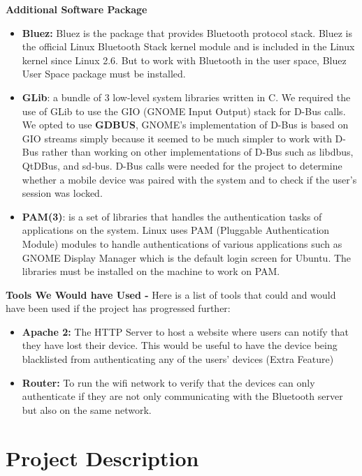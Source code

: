 \documentclass[letterpaper,twocolumn,10pt]{article}
\begin{document}
\hrulefill

\textbf{Additional Software Package}
\begin{itemize}[noitemsep]
\item \textbf{Bluez:} Bluez is the package that provides Bluetooth protocol stack. Bluez is the official Linux Bluetooth Stack kernel module and is included in the Linux kernel since Linux 2.6. But to work with Bluetooth in the user space, Bluez User Space package must be installed.
\item \textbf{GLib}: a bundle of 3 low-level system libraries written in C. We required the use of GLib to use the GIO (GNOME Input Output) stack for D-Bus calls. We opted to use \textbf{GDBUS}, GNOME's implementation of D-Bus is based on GIO streams simply because it seemed to be much simpler to work with D-Bus rather than working on other implementations of D-Bus such as libdbus, QtDBus, and sd-bus. D-Bus calls were needed for the project to determine whether a mobile device was paired with the system and to check if the user's session was locked.

\item \textbf{PAM(3)}: is a set of libraries that handles the authentication tasks of applications on the system. Linux uses PAM (Pluggable Authentication Module) modules to handle authentications of various applications such as GNOME Display Manager which is the default login screen for Ubuntu. The libraries must be installed on the machine to work on PAM.
\end{itemize}

\hrulefill

\textbf{Tools We Would have Used -}
Here is a list of tools that could and would have been used if the project has progressed further:
\begin{itemize}[noitemsep]
\item \textbf{Apache 2:} The HTTP Server to host a website where users can notify that they have lost their device. This would be useful to have the device being blacklisted from authenticating any of the users' devices (Extra Feature)
\item \textbf{Router:} To run the wifi network to verify that the devices can only authenticate if they are not only communicating with the Bluetooth server but also on the same network.
\end{itemize}
\label{Section 4}

\section{Project Description}
\label{Section 5}
\end{document}
